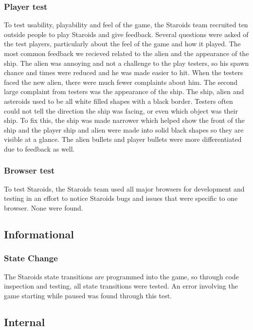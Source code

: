 \documentclass[12pt, titlepage]{article}
\begin{document}
\subsubsection{Player test}
To test usability, playability and feel of the game, the Staroids team recruited ten outside people to play Staroids and give feedback. Several questions were asked of the test players, particularly about the feel of the game and how it played. The most common feedback we recieved related to the alien and the appearance of the ship. The alien was annoying and not a challenge to the play testers, so his spawn chance and times were reduced and he was made easier to hit. When the testers faced the new alien, there were much fewer complaints about him. The second large complaint from testers was the appearance of the ship. The ship, alien and asteroids used to be all white filled shapes with a black border. Testers often could not tell the direction the ship was facing, or even which object was their ship. To fix this, the ship was made narrower which helped show the front of the ship and the player ship and alien were made into solid black shapes so they are visible at a glance. The alien bullets and player bullets were more differentiated due to feedback as well.\\

\subsubsection{Browser test}
To test Staroids, the Staroids team used all major browsers for development and testing in an effort to notice Staroids bugs and issues that were specific to one browser. None were found.\\

\subsection{Informational}

\subsubsection{State Change}
The Staroids state transitions are programmed into the game, so through code inspection and testing, all state transitions were tested. An error involving the game starting while paused was found through this test.

\subsection{Internal}
\end{document}
